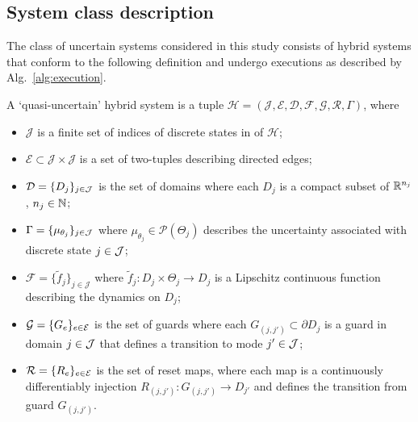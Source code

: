 \subsection{System class description}
  The class of uncertain systems considered in this study consists of hybrid systems that conform to the following definition and undergo executions as described by Alg.~\ref{alg:execution}.
\begin{defn}\label{def:system}
  A `quasi-uncertain' hybrid system is a tuple \mbox{$\mathcal H=(\mathcal J,\mathcal E,\mathcal D,\mathcal F,\mathcal G,\mathcal R,\Gamma)$}, where
  \begin{itemize}
    \item $\mathcal J$ is a finite set of indices of discrete states in of $\mathcal H$;
    \item $\mathcal E\subset \mathcal J\times \mathcal J$ is a set of two-tuples describing directed edges;
    \item $\mathcal D = \{D_j\}_{j \in {\cal J}}$ is the set of domains where each $D_j$ is a compact subset of $\mathbb{R}^{n_j}$, $n_j \in \mathbb{N}$;
    \item $\Gamma = \{\mu_{\theta_j} \}_{j \in {\cal J}}$ where $\mu_{\theta_j}\in \mathcal P(\Theta_j)$ describes the uncertainty associated with discrete state $j \in {\cal J}$;
    \item $\mathcal F=\{\tilde f_j\}_{j\in \mathcal J}$ where $\tilde{f}_j: D_j \times \Theta_j \to D_j$ is a Lipschitz continuous function describing the dynamics on $D_j$;
    \item $\mathcal G=\{G_e\}_{e \in {\cal E}}$ is the set of guards where each $G_{(j,j')} \subset \partial D_j$ is a guard in domain $j \in {\cal J}$ that defines a transition to mode $j' \in {\cal J}$;
    \item $\mathcal R = \{R_e\}_{e \in {\cal E}}$ is the set of reset maps, where each map is a continuously differentiably injection $R_{(j,j')}: G_{(j,j')} \to D_{j'}$ and defines the transition from guard $G_{(j,j')}$.
  \end{itemize}
\end{defn}

